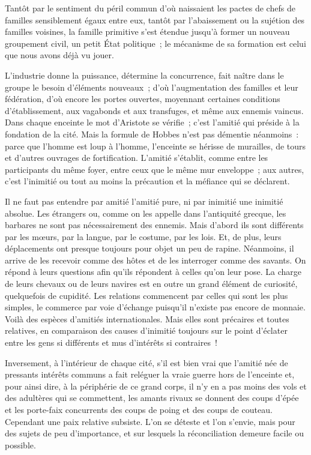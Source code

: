\documentclass[french,twoside]{book} %
\begin{document}
\noindent Tantôt par le sentiment du péril commun d’où naissaient les pactes de chefs de familles sensiblement égaux entre eux, tantôt par l’abaissement ou la sujétion des familles voisines, la famille primitive s’est étendue jusqu’à former un nouveau groupement civil, un petit État politique ; le mécanisme de sa formation est celui que nous avons déjà vu jouer.\par
L’industrie donne la puissance, détermine la concurrence, fait naître dans le groupe le besoin d’éléments nouveaux ; d’où l’augmentation des familles et leur fédération, d’où encore les portes ouvertes, moyennant certaines conditions d’établissement, aux vagabonds et aux transfuges, et même aux ennemis vaincus. Dans chaque enceinte le mot d’Aristote se vérifie ; c’est l’amitié qui préside à la fondation de la cité. Mais la formule de Hobbes n’est pas démentie néanmoins : parce que l’homme est loup à l’homme, l’enceinte se hérisse de murailles, de tours et d’autres ouvrages de fortification. L’amitié s’établit, comme entre les participants du même foyer, entre ceux que le même mur enveloppe ; aux autres, c’est l’inimitié ou tout au moins la précaution et la méfiance qui se déclarent.\par
Il ne faut pas entendre par amitié l’amitié pure, ni par inimitié une inimitié absolue. Les étrangers ou, comme on les appelle dans l’antiquité grecque, les barbares ne sont pas nécessairement des ennemis. Mais d’abord ils sont différents par les mœurs, par la langue, par le costume, par les lois. Et, de plus, leurs déplacements ont presque toujours pour objet un peu de rapine. Néanmoins, il arrive de les recevoir comme des hôtes et de les interroger comme des savants. On répond à leurs questions afin qu’ils répondent à celles qu’on leur pose. La charge de leurs chevaux ou de leurs navires est en outre un grand élément de curiosité, quelquefois de cupidité. Les relations commencent par celles qui sont les plus simples, le commerce par voie d’échange puisqu’il n’existe pas encore de monnaie. Voilà des espèces d’amitiés internationales. Mais elles sont précaires et toutes relatives, en comparaison des causes d’inimitié toujours sur le point d’éclater entre les gens si différents et mus d’intérêts si contraires !\par
Inversement, à l’intérieur de chaque cité, s’il est bien vrai que l’amitié née de pressants intérêts communs a fait reléguer la vraie guerre hors de l’enceinte et, pour ainsi dire, à la périphérie de ce grand corps, il n’y en a pas moins des vols et des adultères qui se commettent, les amants rivaux se donnent des coups d’épée et les porte-faix concurrents des coups de poing et des coups de couteau. Cependant une paix relative subsiste. L’on se déteste et l’on s’envie, mais pour des sujets de peu d’importance, et sur lesquels la réconciliation demeure facile ou possible.\par
\end{document}
